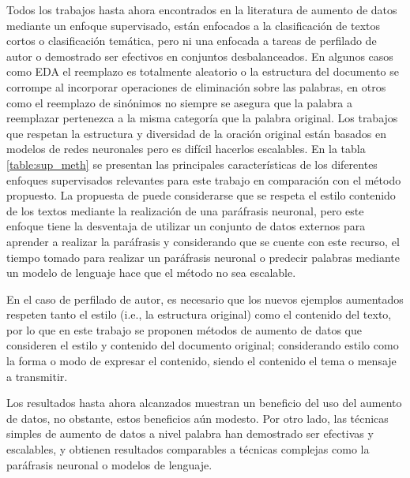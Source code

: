 Todos los trabajos hasta ahora encontrados en la literatura de aumento de datos mediante un enfoque supervisado, están enfocados a la clasificación de textos cortos o clasificación temática,  pero ni una enfocada a tareas de perfilado de autor o demostrado ser efectivos en conjuntos desbalanceados. En algunos casos como EDA el reemplazo es totalmente aleatorio o la estructura del documento se corrompe al incorporar operaciones de eliminación sobre las palabras, en otros como el reemplazo de sinónimos no siempre se asegura que la palabra a reemplazar pertenezca a la misma categoría que la palabra original. Los trabajos que respetan la estructura y diversidad de la oración original están basados en modelos de redes neuronales pero es difícil hacerlos escalables. En la tabla \ref{table:sup_meth} se presentan las principales características de los diferentes enfoques supervisados relevantes para este trabajo en comparación con el método propuesto. La propuesta de \cite{kumar2019submodular} puede considerarse que se respeta el estilo  contenido de los textos mediante la realización de una paráfrasis neuronal, pero este enfoque tiene la desventaja de utilizar un conjunto de datos externos para aprender a realizar la paráfrasis y considerando que se cuente con este recurso, el tiempo tomado para realizar un paráfrasis neuronal o predecir palabras mediante un modelo de lenguaje hace que el método no sea escalable.

En el caso de perfilado de autor, es necesario que los nuevos ejemplos aumentados respeten tanto el estilo (i.e., la estructura original) como el contenido del texto, por lo que en este trabajo se proponen métodos de aumento de datos que consideren el estilo y contenido del documento original; considerando estilo como la forma o modo de expresar el contenido, siendo el contenido el tema o mensaje a transmitir.

Los resultados hasta ahora alcanzados muestran un beneficio del uso del aumento de datos, no obstante, estos beneficios aún modesto. Por otro lado, las técnicas simples de aumento de datos a nivel palabra han demostrado ser efectivas y escalables, y obtienen resultados comparables a técnicas complejas como  la paráfrasis neuronal o modelos de lenguaje.


